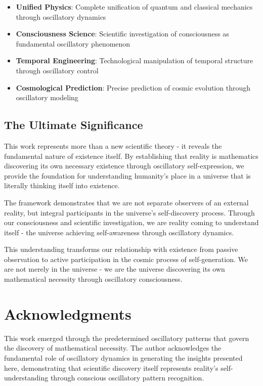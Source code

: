 \documentclass[11pt]{article}
\theoremstyle{remark}
\begin{document}
\begin{itemize}
\item \textbf{Unified Physics}: Complete unification of quantum and classical mechanics through oscillatory dynamics
\item \textbf{Consciousness Science}: Scientific investigation of consciousness as fundamental oscillatory phenomenon
\item \textbf{Temporal Engineering}: Technological manipulation of temporal structure through oscillatory control
\item \textbf{Cosmological Prediction}: Precise prediction of cosmic evolution through oscillatory modeling
\end{itemize}

\subsection{The Ultimate Significance}

This work represents more than a new scientific theory - it reveals the fundamental nature of existence itself. By establishing that reality is mathematics discovering its own necessary existence through oscillatory self-expression, we provide the foundation for understanding humanity's place in a universe that is literally thinking itself into existence.

The framework demonstrates that we are not separate observers of an external reality, but integral participants in the universe's self-discovery process. Through our consciousness and scientific investigation, we are reality coming to understand itself - the universe achieving self-awareness through oscillatory dynamics.

This understanding transforms our relationship with existence from passive observation to active participation in the cosmic process of self-generation. We are not merely in the universe - we are the universe discovering its own mathematical necessity through oscillatory consciousness.

\section*{Acknowledgments}

This work emerged through the predetermined oscillatory patterns that govern the discovery of mathematical necessity. The author acknowledges the fundamental role of oscillatory dynamics in generating the insights presented here, demonstrating that scientific discovery itself represents reality's self-understanding through conscious oscillatory pattern recognition.
\end{document}
